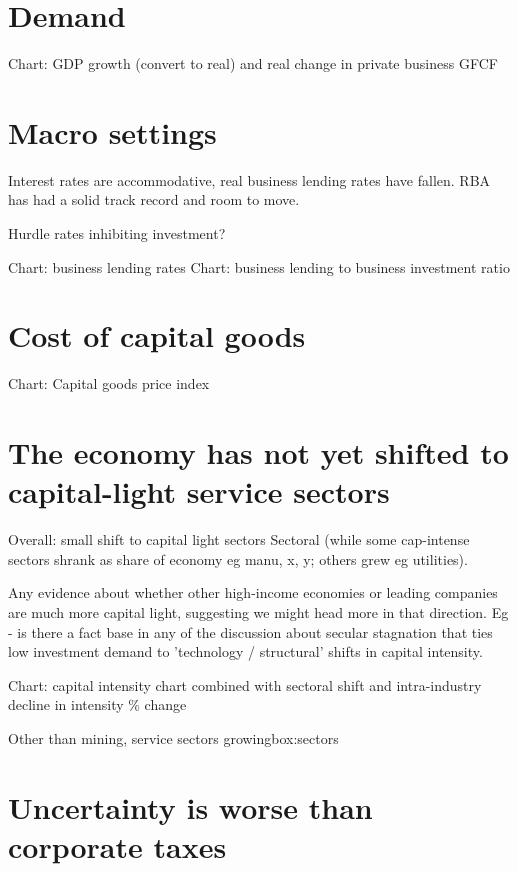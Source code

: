 \section{Demand}

Chart: GDP growth (convert to real) and real change in private business GFCF

\section{Macro settings}

Interest rates are accommodative, real business lending rates have fallen. RBA has had a solid track record and room to move.

Hurdle rates inhibiting investment?

Chart: business lending rates
Chart: business lending to business investment ratio

\section{Cost of capital goods}

Chart: Capital goods price index

\section{The economy has not yet shifted to capital-light service sectors}

Overall: small shift to capital light sectors
Sectoral (while some cap-intense sectors shrank as share of economy eg manu, x, y; others grew eg utilities).

Any evidence about whether other high-income economies or leading companies are much more capital light, suggesting we might head more in that direction. Eg - is there a fact base in any of the discussion about secular stagnation that ties low investment demand to 'technology / structural' shifts in capital intensity. 

Chart: capital intensity chart combined with sectoral shift and intra-industry decline in intensity \% change

\begin{smallbox}
{Other than mining, service sectors growing}{box:sectors}
\end{smallbox}

\section{Uncertainty is worse than corporate taxes}

